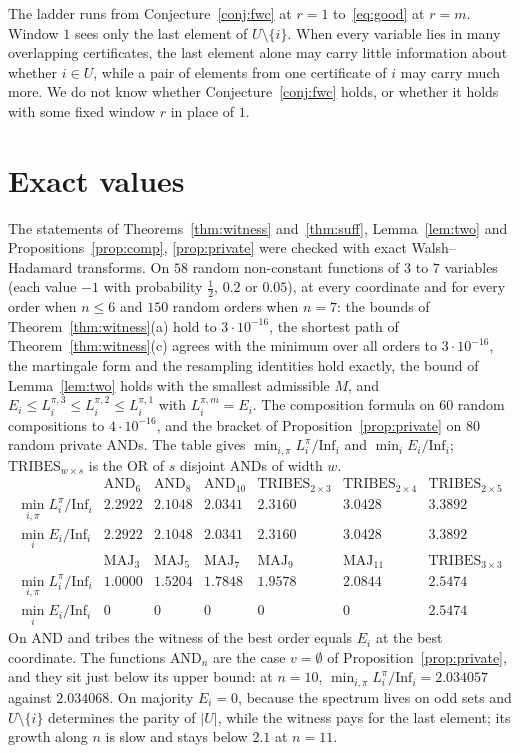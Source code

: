 \documentclass[11pt]{amsart}
\theoremstyle{remark}
\newcommand{\Inf}{\mathrm{Inf}}
\begin{document}
The ladder runs from Conjecture~\ref{conj:fwc} at $r=1$ to~\eqref{eq:good} at $r=m$. Window $1$ sees only the last element
of $U\setminus\{i\}$. When every variable lies in many overlapping certificates, the last element alone may carry
little information about whether $i\in U$, while a pair of elements from one certificate of $i$ may carry much more.
We do not know whether Conjecture~\ref{conj:fwc} holds, or whether it holds with some fixed window $r$ in place
of $1$.

\section{Exact values}\label{sec:num}

The statements of Theorems~\ref{thm:witness} and~\ref{thm:suff}, Lemma~\ref{lem:two} and Propositions~\ref{prop:comp},
\ref{prop:private} were checked with exact Walsh--Hadamard transforms. On $58$ random non-constant functions of $3$ to
$7$ variables (each value $-1$ with probability $\tfrac12$, $0.2$ or $0.05$), at every coordinate and for every order
when $n\le6$ and $150$ random orders when $n=7$: the bounds of Theorem~\ref{thm:witness}(a) hold to $3\cdot10^{-16}$,
the shortest path of Theorem~\ref{thm:witness}(c) agrees with the minimum over all orders to $3\cdot10^{-16}$, the
martingale form and the resampling identities hold exactly, the bound of Lemma~\ref{lem:two} holds with the smallest
admissible $M$, and $E_i\le L^{\pi,3}_i\le L^{\pi,2}_i\le L^{\pi,1}_i$ with $L^{\pi,m}_i=E_i$. The composition
formula on $60$ random compositions to $4\cdot10^{-16}$, and the bracket of Proposition~\ref{prop:private} on $80$ random
private ANDs. The table gives $\min_{i,\pi}L^\pi_i/\Inf_i$ and $\min_iE_i/\Inf_i$; $\mathrm{TRIBES}_{w\times s}$ is
the OR of $s$ disjoint ANDs of width $w$.
\[
\begin{array}{lcccccc}
 & \mathrm{AND}_6 & \mathrm{AND}_8 & \mathrm{AND}_{10} & \mathrm{TRIBES}_{2\times3} & \mathrm{TRIBES}_{2\times4} & \mathrm{TRIBES}_{2\times5}\\
\min_{i,\pi}L^\pi_i/\Inf_i & 2.2922 & 2.1048 & 2.0341 & 2.3160 & 3.0428 & 3.3892\\
\min_iE_i/\Inf_i & 2.2922 & 2.1048 & 2.0341 & 2.3160 & 3.0428 & 3.3892\\[4pt]
 & \mathrm{MAJ}_3 & \mathrm{MAJ}_5 & \mathrm{MAJ}_7 & \mathrm{MAJ}_9 & \mathrm{MAJ}_{11} & \mathrm{TRIBES}_{3\times3}\\
\min_{i,\pi}L^\pi_i/\Inf_i & 1.0000 & 1.5204 & 1.7848 & 1.9578 & 2.0844 & 2.5474\\
\min_iE_i/\Inf_i & 0 & 0 & 0 & 0 & 0 & 2.5474
\end{array}
\]
On AND and tribes the witness of the best order equals $E_i$ at the best coordinate. The functions $\mathrm{AND}_n$ are
the case $v=\emptyset$ of Proposition~\ref{prop:private}, and they sit just below its upper bound: at $n=10$,
$\min_{i,\pi}L^\pi_i/\Inf_i=2.034057$ against $2.034068$. On majority
$E_i=0$, because the spectrum lives on odd sets and $U\setminus\{i\}$ determines the parity of $|U|$, while the witness
pays for the last element; its growth along $n$ is slow and stays below $2.1$ at $n=11$.
\end{document}
